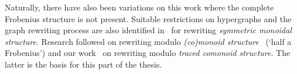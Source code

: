 Naturally, there have also been variations on this work where the complete
Frobenius structure is not present.
Suitable restrictions on hypergraphs and the graph rewriting process are also
identified in~\cite{bonchi2016rewriting} for rewriting
\emph{symmetric monoidal structure}.
Research followed on rewriting modulo
\emph{(co)monoid structure}~\cite{milosavljevic2023string} (`half a Frobenius')
and our work~\cite{ghica2023rewriting} on rewriting modulo
\emph{traced comonoid structure}.
The latter is the basis for this part of the thesis.